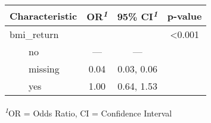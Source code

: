 \setlength{\LTpost}{0mm}
\begin{longtable}{lccc}
\toprule
\textbf{Characteristic} & \textbf{OR}\textsuperscript{\textit{1}} & \textbf{95\% CI}\textsuperscript{\textit{1}} & \textbf{p-value} \\ 
\midrule
bmi\_return &  &  & <0.001 \\ 
    no & — & — &  \\ 
    missing & 0.04 & 0.03, 0.06 &  \\ 
    yes & 1.00 & 0.64, 1.53 &  \\ 
\bottomrule
\end{longtable}
\begin{minipage}{\linewidth}
\textsuperscript{\textit{1}}OR = Odds Ratio, CI = Confidence Interval\\
\end{minipage}

